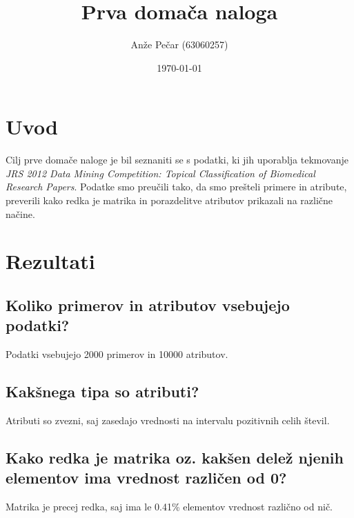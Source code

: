 \documentclass[a4paper,11pt]{article}
\title{Prva domača naloga}
\author{Anže Pečar (63060257)}
\date{\today}
\begin{document}
\maketitle

\section{Uvod}

Cilj prve domače naloge je bil seznaniti se s podatki, ki jih uporablja tekmovanje \textit{JRS 2012 Data Mining Competition: Topical Classification of Biomedical Research Papers}. Podatke smo preučili tako, da smo prešteli primere in atribute, preverili kako redka je matrika in porazdelitve atributov prikazali na različne načine.

\section{Rezultati}

\subsection*{Koliko primerov in atributov vsebujejo podatki?}
Podatki vsebujejo 2000 primerov in 10000 atributov.

\subsection*{Kakšnega tipa so atributi?}
Atributi so zvezni, saj zasedajo vrednosti na intervalu pozitivnih celih števil. 

\subsection*{Kako redka je matrika oz. kakšen delež njenih elementov ima vrednost različen od 0?}
Matrika je precej redka, saj ima le 0.41\% elementov vrednost različno od nič.  
\end{document}
